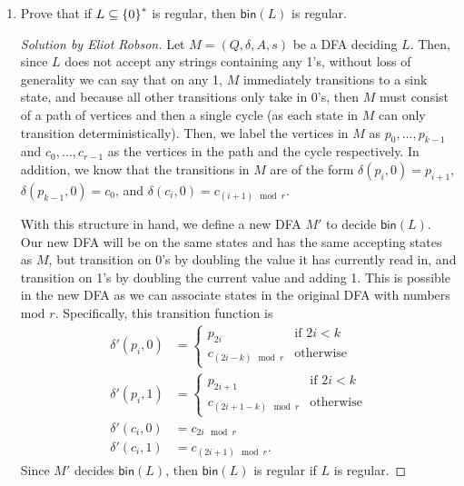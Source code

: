 \documentclass{article}
\newenvironment{solution}[1]{\begin{proof}[Solution by #1]}{\end{proof}}
\newcommand{\bin}{\mathsf{bin}}
\begin{document}
\begin{enumerate}
    \item Prove that if \(L \subseteq \set{0}^*\) is regular, then \(\bin(L)\) is regular.
    
    \begin{solution}{Eliot Robson}
        Let \(M = (Q, \delta, A, s)\) be a DFA deciding \(L\). Then, since \(L\) does not accept any strings containing any 1's, without loss of generality we can say that on any 1, \(M\) immediately transitions to a sink state, and because all other transitions only take in 0's, then \(M\) must consist of a path of vertices and then a single cycle (as each state in \(M\) can only transition deterministically). Then, we label the vertices in \(M\) as \(p_0, \dots, p_{k-1}\) and \(c_0, \dots, c_{r-1}\) as the vertices in the path and the cycle respectively. In addition, we know that the transitions in \(M\) are of the form \(\delta(p_i, 0) = p_{i+1}\), \(\delta(p_{k-1}, 0) = c_0\), and \(\delta(c_{i}, 0) = c_{(i + 1) \mod r}\).
        
        With this structure in hand, we define a new DFA \(M'\) to decide \(\bin(L)\). Our new DFA will be on the same states and has the same accepting states as \(M\), but transition on 0's by doubling the value it has currently read in, and transition on 1's by doubling the current value and adding 1. This is possible in the new DFA as we can associate states in the original DFA with numbers mod \(r\). Specifically, this transition function is
        \begin{align*}
            \delta' (p_i, 0)
            &=%
            \begin{cases}
                p_{2i} &\text{if } 2i < k\\
                c_{(2i - k) \mod r}&\text{otherwise}
            \end{cases}\\
            \delta' (p_i, 1)
            &=%
            \begin{cases}
                p_{2i + 1} &\text{if } 2i < k\\
                c_{(2i + 1 - k) \mod r}&\text{otherwise}
            \end{cases}\\
            \delta' (c_i, 0)
            &=%
            c_{2i \mod r}\\
            \delta' (c_i, 1)
            &=%
            c_{(2i + 1) \mod r}.
        \end{align*}
        Since \(M'\) decides \(\bin(L)\), then \(\bin(L)\) is regular if \(L\) is regular.
    \end{solution}
    

\end{enumerate}
\end{document}
